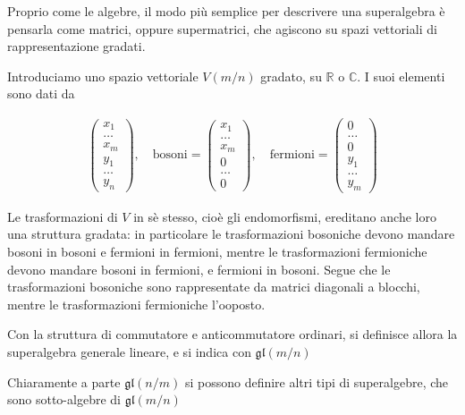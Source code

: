 \documentclass{report}
\begin{document}
Proprio come le algebre, il modo più semplice per descrivere una superalgebra è pensarla come matrici, oppure supermatrici, che agiscono su spazi vettoriali di rappresentazione gradati. 

Introduciamo uno spazio vettoriale \(V(m/n)\) gradato, su \(\mathbb{R}\) o \(\mathbb{C}\). I suoi elementi sono dati da 

\begin{align}
    \begin{pmatrix}
        x_1 \\ \ldots \\ x_m \\ y_1 \\ \ldots \\ y_n
    \end{pmatrix}, \quad \text{bosoni} = \begin{pmatrix}
        x_1 \\ \ldots \\ x_m \\ 0 \\ \ldots \\ 0
    \end{pmatrix}, \quad \text{fermioni} = \begin{pmatrix}
        0 \\ \ldots \\ 0 \\ y_1 \\ \ldots \\ y_m 
    \end{pmatrix}
\end{align}

Le trasformazioni di \(V\) in sè stesso, cioè gli endomorfismi, ereditano anche loro una struttura gradata: in particolare le trasformazioni bosoniche devono mandare bosoni in bosoni e fermioni in fermioni, mentre le trasformazioni fermioniche devono mandare bosoni in fermioni, e fermioni in bosoni. Segue che le trasformazioni bosoniche sono rappresentate da matrici diagonali a blocchi, mentre le trasformazioni fermioniche l'ooposto. 

Con la struttura di commutatore e anticommutatore ordinari, si definisce allora la superalgebra generale lineare, e si indica con \(\mathfrak{gl}(m/n)\)

Chiaramente a parte \(\mathfrak{gl}(n/m)\) si possono definire altri tipi di superalgebre, che sono sotto-algebre di \(\mathfrak{gl}(m/n)\) 
\end{document}
